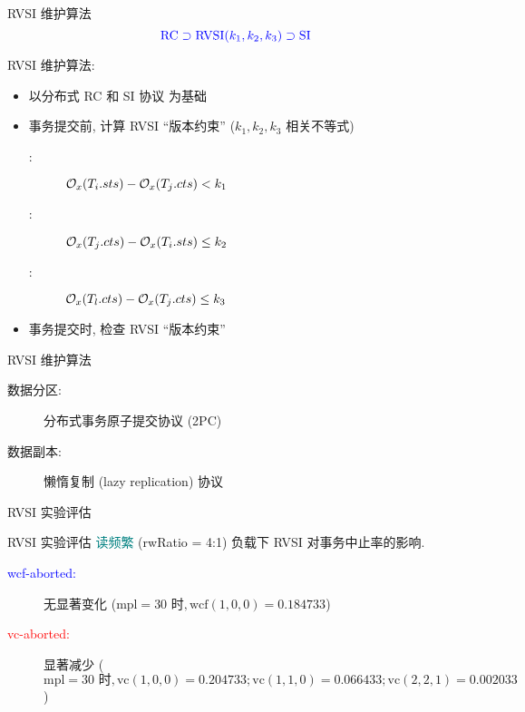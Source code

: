 \begin{frame}{RVSI 维护算法}
  \[
    \textcolor{blue}{\text{RC} \supset \text{RVSI}(k_1, k_2, k_3) \supset \text{SI}}
  \]

  \vspace{0.10cm}

  RVSI 维护算法:
  \begin{itemize}
    \item 以分布式 RC 和 SI 协议 为基础
	  \pause
    \item 事务提交前, 计算 RVSI ``版本约束'' ($k_1, k_2, k_3$ 相关不等式)
	  \begin{description}
		\item[\konebv{}:] $\mathcal{O}_{x}(T_i.{sts}) - \mathcal{O}_{x}(T_j.{cts}) < k_1$
		\item[\ktwofv{}:] $\mathcal{O}_{x}(T_j.{cts}) - \mathcal{O}_{x}(T_i.{sts}) \le k_2$
		\item[\kthreesv{}:] $\mathcal{O}_{x}(T_l.{cts}) - \mathcal{O}_{x}(T_j.{cts}) \le k_3$
	  \end{description}
    \item 事务提交时, 检查 RVSI ``版本约束''
  \end{itemize}

\end{frame}
\begin{frame}{RVSI 维护算法}
  \begin{description}
	\item[数据分区:] 分布式事务原子提交协议 {\small (2PC)}
	\item[数据副本:] 懒惰复制 {\small (lazy replication)} 协议
  \end{description}

\end{frame}
\begin{frame}{RVSI 实验评估}
  
\end{frame}
\begin{frame}{RVSI 实验评估}
  {\textcolor{teal}{读频繁} (rwRatio = 4:1) 负载下 RVSI 对事务中止率的影响.}

	\pause
  \begin{description}
	\item[\textcolor{blue}{wcf-aborted:}] 无显著变化 {\small ($\text{mpl} = 30\text{ 时}, \text{wcf}(1,0,0) = 0.184733$)}
	  \pause
	\item[\textcolor{red}{vc-aborted:}] 显著减少 {\small ($\text{mpl} = 30 \text{ 时}, 
	  \text{vc}(1,0,0) = 0.204733; \text{vc}(1,1,0) = 0.066433; \text{vc}(2,2,1) = 0.002033$)}
  \end{description}
\end{frame}
